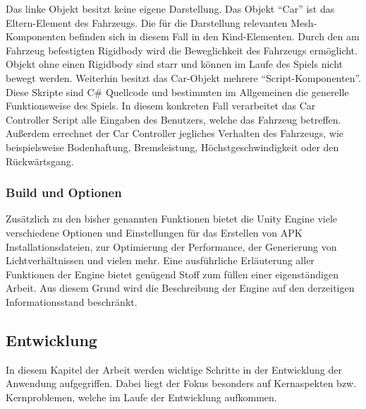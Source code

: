 Das linke Objekt besitzt keine eigene Darstellung. Das Objekt \enquote{Car} ist das Eltern-Element des Fahrzeugs. Die für die Darstellung relevanten Mesh-Komponenten befinden sich in diesem Fall in den Kind-Elementen. Durch den am Fahrzeug befestigten Rigidbody wird die Beweglichkeit des Fahrzeugs ermöglicht. Objekt ohne einen Rigidbody sind starr und können im Laufe des Spiels nicht bewegt werden.
Weiterhin besitzt das Car-Objekt mehrere \enquote{Script-Komponenten}. Diese Skripte sind C\# Quellcode und bestimmten im Allgemeinen die generelle Funktionsweise des Spiels. In diesem konkreten Fall verarbeitet das Car Controller Script alle Eingaben des Benutzers, welche das Fahrzeug betreffen. Außerdem errechnet der Car Controller jegliches Verhalten des Fahrzeugs, wie beispielsweise Bodenhaftung, Bremsleistung, Höchstgeschwindigkeit oder den Rückwärtsgang.

\subsubsection{Build und Optionen}
Zusätzlich zu den bisher genannten Funktionen bietet die Unity Engine viele verschiedene Optionen und Einstellungen für das Erstellen von APK Installationsdateien, zur Optimierung der Performance, der Generierung von Lichtverhältnissen und vielen mehr. Eine ausführliche Erläuterung aller Funktionen der Engine bietet genügend Stoff zum füllen einer eigenständigen Arbeit. Aus diesem Grund wird die Beschreibung der Engine auf den derzeitigen Informationsstand beschränkt.

\subsection{Entwicklung}
In diesem Kapitel der Arbeit werden wichtige Schritte in der Entwicklung der Anwendung aufgegriffen. Dabei liegt der Fokus besonders auf Kernaspekten bzw. Kernproblemen, welche im Laufe der Entwicklung aufkommen.
